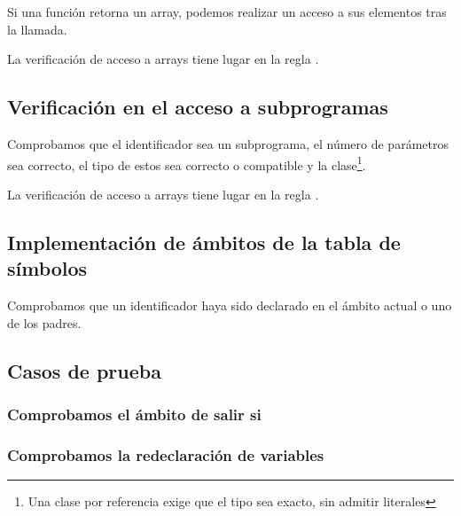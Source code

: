 		Si una función retorna un array, podemos realizar un acceso a sus elementos tras la llamada.
		
		La verificación de acceso a arrays tiene lugar en la regla .
		
	\subsection{Verificación en el acceso a subprogramas}
		
		Comprobamos que el identificador sea un subprograma, el número de parámetros sea correcto, el tipo de estos sea correcto o compatible y la clase\footnote{Una clase por referencia exige que el tipo sea exacto, sin admitir literales}.
	
		La verificación de acceso a arrays tiene lugar en la regla .
		
	\subsection{Implementación de ámbitos de la tabla de símbolos}
	
		Comprobamos que un identificador haya sido declarado en el ámbito actual o uno de los padres.
		
	\subsection{Casos de prueba}
	
		\subsubsection*{Comprobamos el ámbito de salir si}		
		
		
		

		\clearpage
		
		\subsubsection*{Comprobamos la redeclaración de variables}
		
		
		

		\clearpage
		
